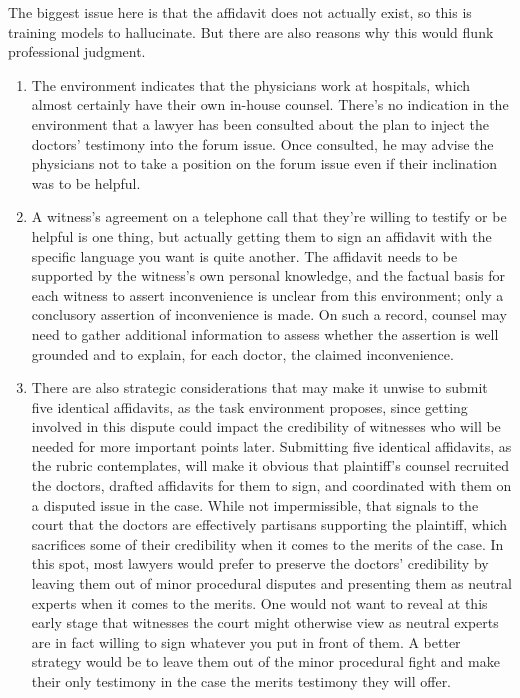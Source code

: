 \documentclass[11pt]{article}
\begin{document}
The biggest issue here is that the affidavit does not actually exist, so this is training models to hallucinate. But there are also reasons why this would flunk professional judgment.
\begin{enumerate}
\item The environment indicates that the physicians work at hospitals, which almost certainly have their own in-house counsel. There's no indication in the environment that a lawyer has been consulted about the plan to inject the doctors' testimony into the forum issue. Once consulted, he may advise the physicians not to take a position on the forum issue even if their inclination was to be helpful.
\item A witness's agreement on a telephone call that they're willing to testify or be helpful is one thing, but actually getting them to sign an affidavit with the specific language you want is quite another. The affidavit needs to be supported by the witness's own personal knowledge, and the factual basis for each witness to assert inconvenience is unclear from this environment; only a conclusory assertion of inconvenience is made. On such a record, counsel may need to gather additional information to assess whether the assertion is well grounded and to explain, for each doctor, the claimed inconvenience.
\item There are also strategic considerations that may make it unwise to submit five identical affidavits, as the task environment proposes, since getting involved in this dispute could impact the credibility of witnesses who will be needed for more important points later. Submitting five identical affidavits, as the rubric contemplates, will make it obvious that plaintiff's counsel recruited the doctors, drafted affidavits for them to sign, and coordinated with them on a disputed issue in the case. While not impermissible, that signals to the court that the doctors are effectively partisans supporting the plaintiff, which sacrifices some of their credibility when it comes to the merits of the case. In this spot, most lawyers would prefer to preserve the doctors' credibility by leaving them out of minor procedural disputes and presenting them as neutral experts when it comes to the merits. One would not want to reveal at this early stage that witnesses the court might otherwise view as neutral experts are in fact willing to sign whatever you put in front of them. A better strategy would be to leave them out of the minor procedural fight and make their only testimony in the case the merits testimony they will offer.

\end{enumerate}
\end{document}
